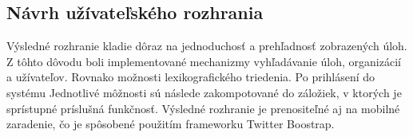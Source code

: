 \subsection{Návrh užívateľského rozhrania}
Výsledné rozhranie kladie dôraz na jednoduchosť a prehľadnosť zobrazených úloh. Z tôhto dôvodu boli implementované mechanizmy vyhľadávanie úloh, organizácií a užívateľov. Rovnako možnosti lexikografického triedenia. Po prihlásení do systému Jednotlivé môžnosti sú následe zakompotované do záložiek, v ktorých je sprístupné príslušná funkčnosť. Výsledné rozhranie je prenositeľné aj na mobilné zaradenie, čo je spôsobené použitím frameworku Twitter Boostrap.



















